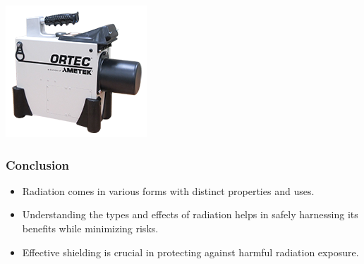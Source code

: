 \documentclass[aspectratio=169]{beamer}
\begin{document}
\begin{frame}
\begin{minipage}{0.32\textwidth}
    \end{minipage}
    \begin{minipage}{0.32\textwidth}
        \centering
        \includegraphics[width=\textwidth]{images/trans-spec-n.png}
    \end{minipage}
\end{frame}

\begin{frame}
    \frametitle{Conclusion}
    \begin{itemize}
        \item Radiation comes in various forms with distinct properties and uses.
        \item Understanding the types and effects of radiation helps in safely harnessing its benefits while minimizing risks.
        \item Effective shielding is crucial in protecting against harmful radiation exposure.
    \end{itemize}
\end{frame}
\end{document}

